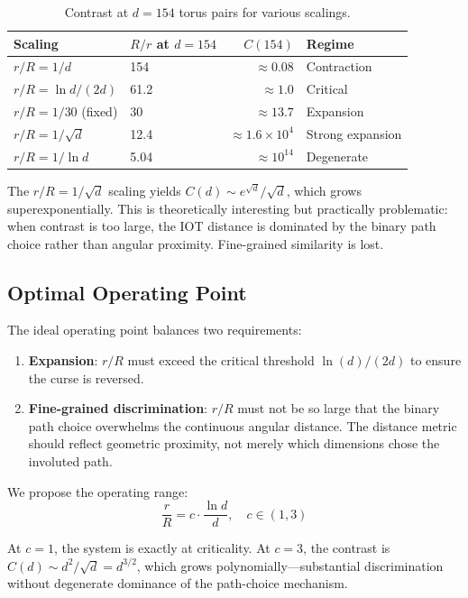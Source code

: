 \begin{table}[h]
\centering
\footnotesize
\begin{tabular}{@{}llrl@{}}
\toprule
Scaling & $R/r$ at $d\!=\!154$ & $C(154)$ & Regime \\
\midrule
$r/R = 1/d$ & 154 & $\approx 0.08$ & Contraction \\
$r/R = \ln d/(2d)$ & 61.2 & $\approx 1.0$ & Critical \\
$r/R = 1/30$ (fixed) & 30 & $\approx 13.7$ & Expansion \\
$r/R = 1/\sqrt{d}$ & 12.4 & $\approx 1.6 \times 10^4$ & Strong expansion \\
$r/R = 1/\ln d$ & 5.04 & $\approx 10^{14}$ & Degenerate \\
\bottomrule
\end{tabular}
\caption{Contrast at $d = 154$ torus pairs for various scalings.}
\label{tab:scalings}
\end{table}

The $r/R = 1/\sqrt{d}$ scaling yields $C(d) \sim e^{\sqrt{d}}/\sqrt{d}$, which grows superexponentially. This is theoretically interesting but practically problematic: when contrast is too large, the IOT distance is dominated by the binary path choice rather than angular proximity. Fine-grained similarity is lost.

\subsection{Optimal Operating Point}

The ideal operating point balances two requirements:
\begin{enumerate}
    \item \textbf{Expansion}: $r/R$ must exceed the critical threshold $\ln(d)/(2d)$ to ensure the curse is reversed.
    \item \textbf{Fine-grained discrimination}: $r/R$ must not be so large that the binary path choice overwhelms the continuous angular distance. The distance metric should reflect geometric proximity, not merely which dimensions chose the involuted path.
\end{enumerate}

We propose the operating range:
\begin{equation}
    \frac{r}{R} = c \cdot \frac{\ln d}{d}, \quad c \in (1, 3)
\end{equation}

At $c = 1$, the system is exactly at criticality. At $c = 3$, the contrast is $C(d) \sim d^2/\sqrt{d} = d^{3/2}$, which grows polynomially---substantial discrimination without degenerate dominance of the path-choice mechanism.

